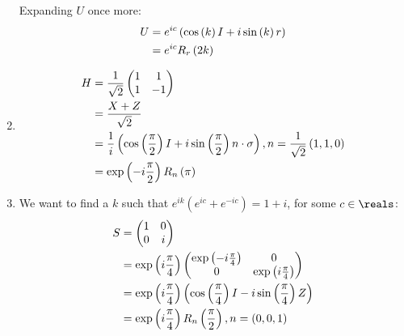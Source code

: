 \begin{enumerate}
%
Expanding $U$ once more:
%
\begin{align}
U &= e^{ic} \left( \cos \left( k \right) I + i \sin \left( k \right) r \right) \\
&= e^{ic} R_r \left( 2k \right)
\end{align}
%
\item \begin{align}
H &= \frac{1}{\sqrt{2}} \begin{pmatrix} 1 & 1 \\ 1 & -1 \end{pmatrix} \\
&= \frac{X + Z}{\sqrt{2}} \\
&= \frac1i \left( \cos \left( \frac{\pi}{2} \right) I + i \sin \left( \frac{\pi}{2} \right) n \cdot \sigma \right), n = \frac{1}{\sqrt{2}} \left( 1, 1, 0 \right) \\
&= \exp \left( -i \frac{\pi}{2} \right) R_n \left( \pi \right)
\end{align}
%
\item We want to find a $k$ such that $e^{ik} \left( e^{ic} + e^{-ic} \right) = 1 + i$, for some $c \in \reals$:
%
\begin{align}
S &= \begin{pmatrix} 1 & 0 \\ 0 & i \end{pmatrix} \\
&= \exp \left( i \frac{\pi}{4} \right) \begin{pmatrix} \exp \left( -i \frac{\pi}{4} \right) & 0 \\ 0 & \exp \left( i \frac{\pi}{4} \right) \end{pmatrix} \\
&= \exp \left( i \frac{\pi}{4} \right) \left( \cos \left( \frac{\pi}{4} \right) I - i \sin \left( \frac{\pi}{4} \right) Z \right) \\
&= \exp \left( i \frac{\pi}{4} \right) R_n \left( \frac{\pi}{2} \right), n = \left(0, 0, 1 \right)
\end{align}
\end{enumerate}
\endgroup
